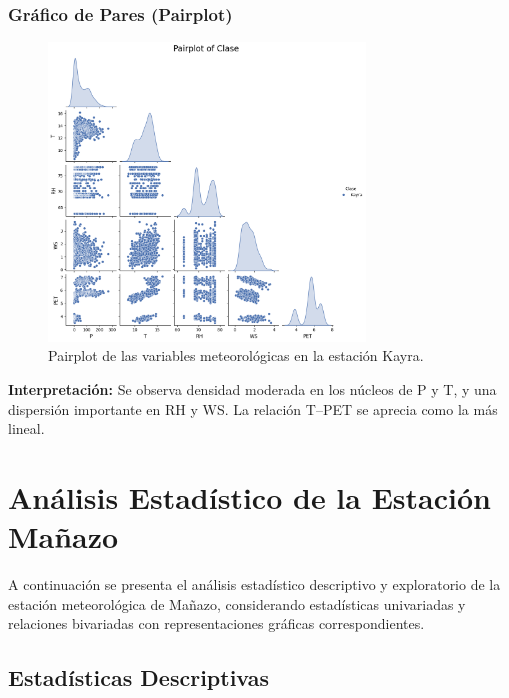 \subsubsection*{Gráfico de Pares (Pairplot)}
\begin{figure}[htbp]
\centering
\includegraphics[width=0.75\textwidth]{resultados/por_estacion_meteorologica/Kayra/pairplot.png}
\caption{Pairplot de las variables meteorológicas en la estación Kayra.}
\label{fig:kayra_pairplot}
\end{figure}
\textbf{Interpretación:} Se observa densidad moderada en los núcleos de P y T, y una dispersión importante en RH y WS. La relación T–PET se aprecia como la más lineal.


\section{Análisis Estadístico de la Estación Mañazo}

A continuación se presenta el análisis estadístico descriptivo y exploratorio de la estación meteorológica de Mañazo, considerando estadísticas univariadas y relaciones bivariadas con representaciones gráficas correspondientes.

\subsection{Estadísticas Descriptivas}

